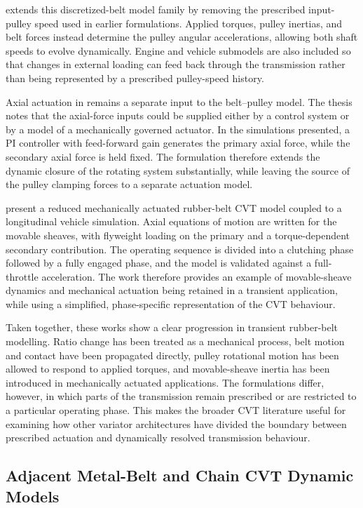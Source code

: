 \documentclass[11pt]{report}
\numberwithin{equation}{section}
\begin{document}
\citet{Ballew2015} extends this discretized-belt model family by removing the prescribed input-pulley speed used in earlier formulations. Applied torques, pulley inertias, and belt forces instead determine the pulley angular accelerations, allowing both shaft speeds to evolve dynamically. Engine and vehicle submodels are also included so that changes in external loading can feed back through the transmission rather than being represented by a prescribed pulley-speed history.

Axial actuation in \citet{Ballew2015} remains a separate input to the belt--pulley model. The thesis notes that the axial-force inputs could be supplied either by a control system or by a model of a mechanically governed actuator. In the simulations presented, a PI controller with feed-forward gain generates the primary axial force, while the secondary axial force is held fixed. The formulation therefore extends the dynamic closure of the rotating system substantially, while leaving the source of the pulley clamping forces to a separate actuation model.

\citet{SilvaEtAl2023} present a reduced mechanically actuated rubber-belt CVT model coupled to a longitudinal vehicle simulation. Axial equations of motion are written for the movable sheaves, with flyweight loading on the primary and a torque-dependent secondary contribution. The operating sequence is divided into a clutching phase followed by a fully engaged phase, and the model is validated against a full-throttle acceleration. The work therefore provides an example of movable-sheave dynamics and mechanical actuation being retained in a transient application, while using a simplified, phase-specific representation of the CVT behaviour.

Taken together, these works show a clear progression in transient rubber-belt modelling. Ratio change has been treated as a mechanical process, belt motion and contact have been propagated directly, pulley rotational motion has been allowed to respond to applied torques, and movable-sheave inertia has been introduced in mechanically actuated applications. The formulations differ, however, in which parts of the transmission remain prescribed or are restricted to a particular operating phase. This makes the broader CVT literature useful for examining how other variator architectures have divided the boundary between prescribed actuation and dynamically resolved transmission behaviour.

\subsection{Adjacent Metal-Belt and Chain CVT Dynamic Models}
\label{sec:lit-metal-chain}
\end{document}
